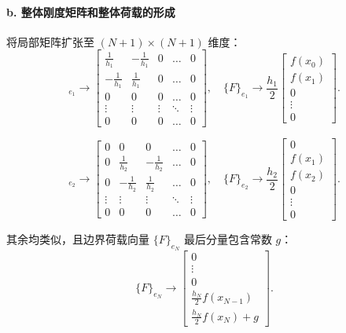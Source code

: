 \paragraph{b. 整体刚度矩阵和整体荷载的形成}
将局部矩阵扩张至 $(N+1) \times (N+1)$ 维度：
\begin{equation*}
[K]_{e_1} \to \begin{bmatrix}
\frac{1}{h_1} & -\frac{1}{h_1} & 0 & \dots & 0 \\
-\frac{1}{h_1} & \frac{1}{h_1} & 0 & \dots & 0 \\
0 & 0 & 0 & \dots & 0 \\
\vdots & \vdots & \vdots & \ddots & \vdots \\
0 & 0 & 0 & \dots & 0
\end{bmatrix}, \quad
\{F\}_{e_1} \to \frac{h_1}{2} \begin{bmatrix} f(x_0) \\ f(x_1) \\ 0 \\ \vdots \\ 0 \end{bmatrix}.
\end{equation*}

\begin{equation*}
[K]_{e_2} \to \begin{bmatrix}
0 & 0 & 0 & \dots & 0 \\
0 & \frac{1}{h_2} & -\frac{1}{h_2} & \dots & 0 \\
0 & -\frac{1}{h_2} & \frac{1}{h_2} & \dots & 0 \\
\vdots & \vdots & \vdots & \ddots & \vdots \\
0 & 0 & 0 & \dots & 0
\end{bmatrix}, \quad
\{F\}_{e_2} \to \frac{h_2}{2} \begin{bmatrix} 0 \\ f(x_1) \\ f(x_2) \\ 0 \\ \vdots \\ 0 \end{bmatrix}.
\end{equation*}

其余均类似，且边界荷载向量 $\{F\}_{e_N}$ 最后分量包含常数 $g$：
\begin{equation*}
\{F\}_{e_N} \to \begin{bmatrix} 0 \\ \vdots \\ 0 \\ \frac{h_N}{2} f(x_{N-1}) \\ \frac{h_N}{2} f(x_N) + g \end{bmatrix}.
\end{equation*}

